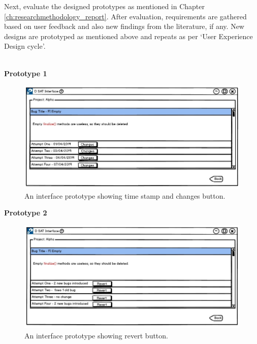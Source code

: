 Next, evaluate the designed prototypes as mentioned in Chapter \ref{ch:researchmethodology_report}. After evaluation, requirements are gathered based on user feedback and also new findings from the literature, if any. New designs are prototyped as mentioned above and repeats as per ‘User Experience Design cycle’. \\ \\

\clearpage

\textbf{Prototype 1}
\\
\begin{figure}[hbt!]
	\centering
	\includegraphics[width=\linewidth]{figures/d_changes}
	\caption{An interface prototype showing time stamp and changes button.}
	\label{fig:d_changes}
\end{figure}

\textbf{Prototype 2}
\\
\begin{figure}[hbt!]
	\centering
	\includegraphics[width=\linewidth]{figures/d_revert}
	\caption{An interface prototype showing revert button.}
	\label{fig:d_revert}
\end{figure}

\let\cleardoublepage\clearpage


	
